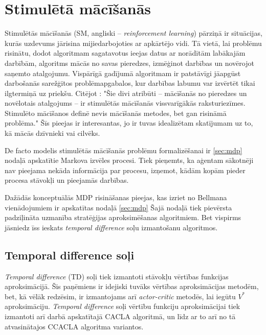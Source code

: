 \documentclass{ludis} %
\begin{document}

\section{Stimulētā mācīšanās} \label{sec:stim}
Stimulētās mācīšanās (SM, angliski -- \textit{reinforcement learning}) pārziņā
ir situācijas, kurās uzdevums jārisina mijiedarbojoties ar apkārtējo vidi. Tā
vietā, lai problēmu risinātu, dodot algoritmam sagatavotus ieejas datus ar
norādītām labākajām darbībām, algoritms mācās no savas pieredzes, izmēģinot
darbības un novērojot saņemto atalgojumu. Vispārīgā gadījumā algoritmam ir
patstāvīgi jāapgūst darbošanās sarežģītos problēmapgabalos, kur darbības labumu
var izvērtēt tikai ilgtermiņā uz priekšu. Citējot \citet{Barto}: "Šie divi
atribūti -- mācīšanās no pieredzes un novēlotais atalgojums -- ir stimulētās
mācīšanās vissvarīgākās raksturiezīmes. Stimulēto mācīšanos definē nevis
mācīšanās metodes, bet gan risināmā problēma." Šīs pieejas ir interesantas, jo
ir tuvas idealizētam skatījumam uz to, kā mācās dzīvnieki vai cilvēks.

De facto modelis stimulētās mācīšanās problēmu formalizēšanai ir \ref{sec:mdp}
nodaļā apskatītie Markova izvēles procesi. Tiek pieņemts, ka aģentam sākotnēji
nav pieejama nekāda informācija par procesu, izņemot, kādām kopām pieder procesa
stāvokļi un pieejamās darbības.

Dažādās konceptuālās MDP risināšanas pieejas, kas izriet no Bellmana
vienādojumiem ir apskatītas nodaļā \ref{sec:mdp} Šajā nodaļā tiek pievērsta
padziļināta uzmanība stratēģijas aproksimēšanas algoritmiem. Bet vispirms
jāsniedz īss ieskats \textit{temporal difference} soļu izmantošanu algoritmos.

\subsection{Temporal difference soļi} \label{sec:td}
\textit{Temporal difference} (TD) soļi tiek izmantoti stāvokļu vērtības
funkcijas aproksimācijā. Šis paņēmiens ir idejiski tuvāks vērtības
aproksimācijas metodēm, bet, kā vēlāk redzēsim, ir izmantojams arī
\textit{actor-critic} metodēs, lai iegūtu $V^*$ aproksimāciju. \textit{Temporal
  difference} soļi vērtību funkciju aproksimācijai tiek izmantoti arī darbā
apskatītajā CACLA algoritmā, un līdz ar to arī no tā atvasinātajos CCACLA
algoritma variantos.
\end{document}
